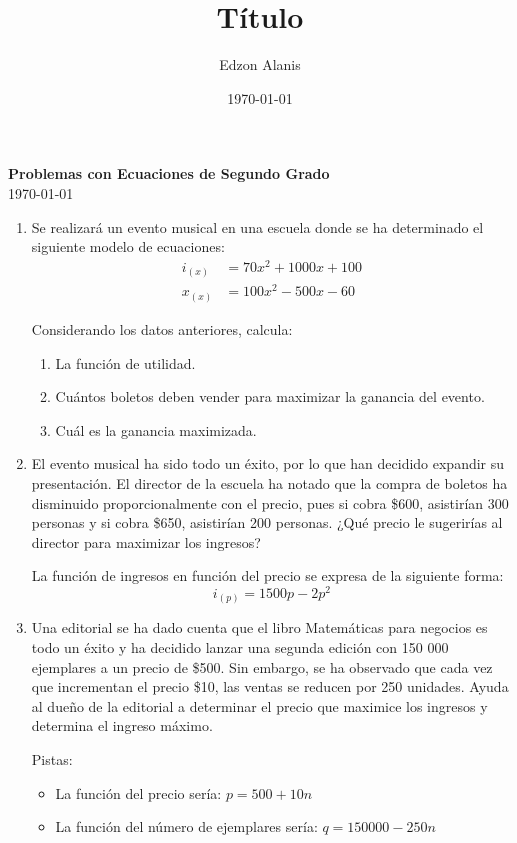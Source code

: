 \documentclass[12pt]{article}
\title{Título}
\author{Edzon Alanis}
\date{\today}
\begin{document}

\begin{center}
    \textbf{\large Problemas con Ecuaciones de Segundo Grado} \\[0.4cm]
    \today
\end{center}

\vspace*{5mm}

\begin{enumerate}
    \item Se realizará un evento musical en una escuela donde se ha determinado el
    siguiente modelo de ecuaciones: \begin{align*}
        i_{(x)} &= 70x^2+1000x+100 \\
        x_{(x)} &= 100x^2-500x-60
    \end{align*}

    Considerando los datos anteriores, calcula: \begin{enumerate}
        \item La función de utilidad.
        \item Cuántos boletos deben vender para maximizar la ganancia del evento.
        \item Cuál es la ganancia maximizada.
    \end{enumerate}

    \item El evento musical ha sido todo un éxito, por lo que han decidido expandir su
    presentación. El director de la escuela ha notado que la compra de boletos ha
    disminuido proporcionalmente con el precio, pues si cobra \$600, asistirían 300
    personas y si cobra \$650, asistirían 200 personas. ¿Qué precio le sugerirías al
    director para maximizar los ingresos?

    La función de ingresos en función del precio se expresa de la siguiente forma:
    \[i_{(p)} = 1500p-2p^2\]

    \item Una editorial se ha dado cuenta que el libro Matemáticas para negocios es todo un
    éxito y ha decidido lanzar una segunda edición con 150 000 ejemplares a un
    precio de \$500. Sin embargo, se ha observado que cada vez que incrementan el
    precio \$10, las ventas se reducen por 250 unidades. Ayuda al dueño de la editorial
    a determinar el precio que maximice los ingresos y determina el ingreso máximo.

    Pistas: \begin{itemize}
        \item La función del precio sería: $p = 500+10n$
        \item La función del número de ejemplares sería: $q = 150000-250n$
    \end{itemize}
\end{enumerate}


\end{document}
